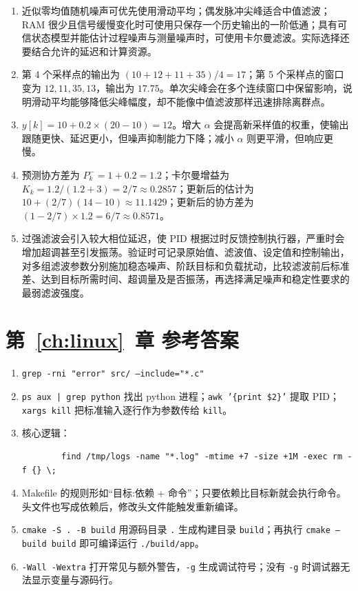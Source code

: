 \begin{enumerate}
	\item 近似零均值随机噪声可优先使用滑动平均；偶发脉冲尖峰适合中值滤波；RAM 很少且信号缓慢变化时可使用只保存一个历史输出的一阶低通；具有可信状态模型并能估计过程噪声与测量噪声时，可使用卡尔曼滤波。实际选择还要结合允许的延迟和计算资源。
	\item 第 4 个采样点的输出为 $(10+12+11+35)/4=17$；第 5 个采样点的窗口变为 $12,11,35,13$，输出为 $17.75$。单次尖峰会在多个连续窗口中保留影响，说明滑动平均能够降低尖峰幅度，却不能像中值滤波那样迅速排除离群点。
	\item $y[k]=10+0.2\times(20-10)=12$。增大 $\alpha$ 会提高新采样值的权重，使输出跟随更快、延迟更小，但噪声抑制能力下降；减小 $\alpha$ 则更平滑，但响应更慢。
	\item 预测协方差为 $P_k^{-}=1+0.2=1.2$；卡尔曼增益为 $K_k=1.2/(1.2+3)=2/7\approx0.2857$；更新后的估计为 $10+(2/7)(14-10)\approx11.1429$；更新后的协方差为 $(1-2/7)\times1.2=6/7\approx0.8571$。
	\item 过强滤波会引入较大相位延迟，使 PID 根据过时反馈控制执行器，严重时会增加超调甚至引发振荡。验证时可记录原始值、滤波值、设定值和控制输出，对多组滤波参数分别施加稳态噪声、阶跃目标和负载扰动，比较滤波前后标准差、达到目标所需时间、超调量及是否振荡，再选择满足噪声和稳定性要求的最弱滤波强度。
\end{enumerate}

\ifrelease
\else
\section*{第~\ref{ch:linux}~章 参考答案}

\begin{enumerate}
	\item \texttt{grep -rni "error" src/ --include="*.c"}
	\item \texttt{ps aux | grep python} 找出 python 进程；\texttt{awk '\{print \$2\}'} 提取 PID；\texttt{xargs kill} 把标准输入逐行作为参数传给 \texttt{kill}。
	\item 核心逻辑：
	\begin{lstlisting}
		find /tmp/logs -name "*.log" -mtime +7 -size +1M -exec rm -f {} \;
	\end{lstlisting}
	\item Makefile 的规则形如“目标:依赖 + 命令”；只要依赖比目标新就会执行命令。头文件也写成依赖后，修改头文件能触发重新编译。
	\item \texttt{cmake -S . -B build} 用源码目录 \texttt{.} 生成构建目录 \texttt{build}；再执行 \texttt{cmake --build build} 即可编译运行 \texttt{./build/app}。
	\item \texttt{-Wall -Wextra} 打开常见与额外警告，\texttt{-g} 生成调试符号；没有 \texttt{-g} 时调试器无法显示变量与源码行。
\end{enumerate}
\fi
